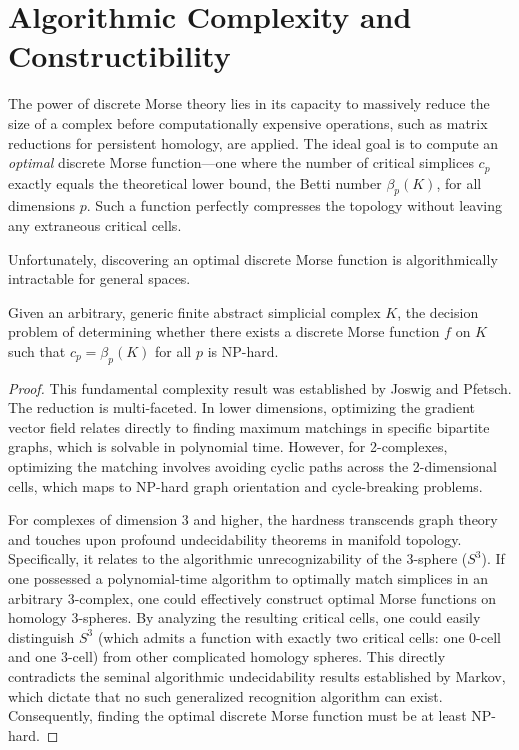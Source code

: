 \section{Algorithmic Complexity and Constructibility}

The power of discrete Morse theory lies in its capacity to massively reduce the size of a complex before computationally expensive operations, such as matrix reductions for persistent homology, are applied. The ideal goal is to compute an \emph{optimal} discrete Morse function—one where the number of critical simplices $c_p$ exactly equals the theoretical lower bound, the Betti number $\beta_p(K)$, for all dimensions $p$. Such a function perfectly compresses the topology without leaving any extraneous critical cells. 

Unfortunately, discovering an optimal discrete Morse function is algorithmically intractable for general spaces.

\begin{theorem}
\label{thm:np_hard}
Given an arbitrary, generic finite abstract simplicial complex $K$, the decision problem of determining whether there exists a discrete Morse function $f$ on $K$ such that $c_p = \beta_p(K)$ for all $p$ is NP-hard.
\end{theorem}

\begin{proof}
This fundamental complexity result was established by Joswig and Pfetsch. The reduction is multi-faceted. In lower dimensions, optimizing the gradient vector field relates directly to finding maximum matchings in specific bipartite graphs, which is solvable in polynomial time. However, for 2-complexes, optimizing the matching involves avoiding cyclic paths across the 2-dimensional cells, which maps to NP-hard graph orientation and cycle-breaking problems.

For complexes of dimension 3 and higher, the hardness transcends graph theory and touches upon profound undecidability theorems in manifold topology. Specifically, it relates to the algorithmic unrecognizability of the 3-sphere ($S^3$). If one possessed a polynomial-time algorithm to optimally match simplices in an arbitrary 3-complex, one could effectively construct optimal Morse functions on homology 3-spheres. By analyzing the resulting critical cells, one could easily distinguish $S^3$ (which admits a function with exactly two critical cells: one $0$-cell and one $3$-cell) from other complicated homology spheres. This directly contradicts the seminal algorithmic undecidability results established by Markov, which dictate that no such generalized recognition algorithm can exist. Consequently, finding the optimal discrete Morse function must be at least NP-hard.
\end{proof}

